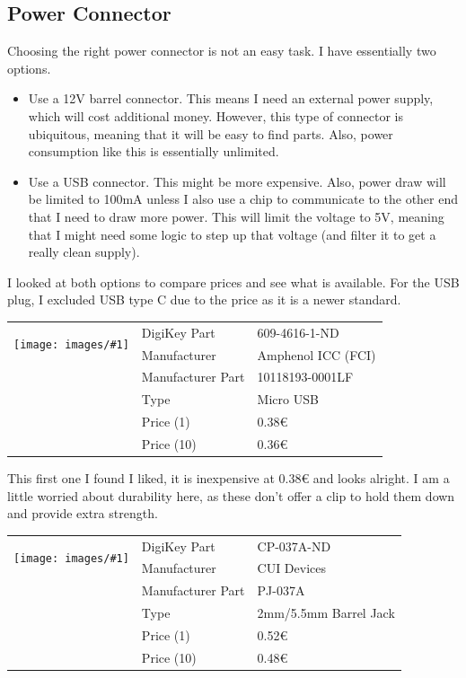 \documentclass[a4paper]{article}
\makeatletter
\newenvironment{partdisplay}[1]{
\begin{center}
\begin{tabular}{@{}p{3cm}p{3cm}p{4.5cm}@{}}
\multirow{2}{3cm}{\texttt{[image: images/\#1]}}}{
\end{tabular}
\end{center}}
\makeatother
\begin{document}
\subsection{Power Connector}

Choosing the right power connector is not an easy task. I have essentially two options.

\begin{itemize}
  \item Use a 12V barrel connector. This means I need an external power supply, which will cost additional money. However, this type of connector is ubiquitous, meaning that it will be easy to find parts. Also, power consumption like this is essentially unlimited.
  \item Use a USB connector. This might be more expensive. Also, power draw will be limited to 100mA unless I also use a chip to communicate to the other end that I need to draw more power. This will limit the voltage to 5V, meaning that I might need some logic to step up that voltage (and filter it to get a really clean supply).
\end{itemize}

I looked at both options to compare prices and see what is available. For the USB plug, I excluded USB type C due to the price as it is a newer standard.

\begin{partdisplay}{10118193-0001LF}
& DigiKey Part & 609-4616-1-ND\\
& Manufacturer & Amphenol ICC (FCI)\\
& Manufacturer Part & 10118193-0001LF\\
& Type & Micro USB\\
& Price (1) & 0.38€\\
& Price (10) & 0.36€\\
\end{partdisplay}

This first one I found I liked, it is inexpensive at 0.38€ and looks alright. I am a little worried about durability here, as these don't offer a clip to hold them down and provide extra strength.

\begin{partdisplay}{MFG_PJ-037A}
& DigiKey Part & CP-037A-ND\\
& Manufacturer & CUI Devices\\
& Manufacturer Part & PJ-037A\\
& Type & 2mm/5.5mm Barrel Jack\\
& Price (1) & 0.52€\\
& Price (10) & 0.48€\\
\end{partdisplay}
\end{document}
